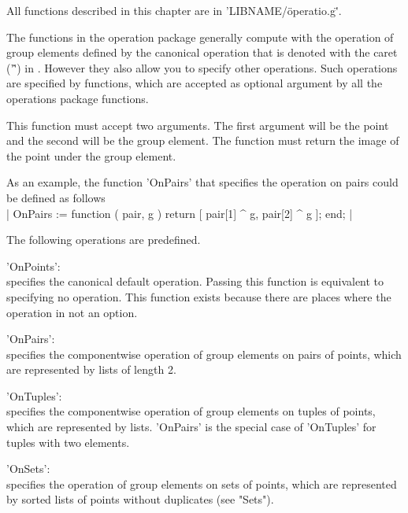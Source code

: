 All functions described in this chapter are in 'LIBNAME/\"operatio.g\"'.

%
%
%
%
%
%
%
%
%
%
%

The functions in   the operation  package   generally  compute  with  the
operation of group elements defined  by the canonical  operation that  is
denoted with the caret ('\^') in {\GAP}.   However they also allow you to
specify other operations.   Such  operations are specified  by functions,
which are  accepted as optional  argument  by all  the operations package
functions.

This function must accept two arguments.   The first argument will be the
point and the second will be the group element.  The function must return
the image of the point under the group element.

As an example, the function  'OnPairs' that  specifies  the operation  on
pairs could be defined as follows\\
|    OnPairs := function ( pair, g )
        return [ pair[1] ^ g, pair[2] ^ g ];
    end; |

The following operations are predefined.

'OnPoints':\\
        specifies the canonical default operation.  Passing this function
        is equivalent to specifying no operation.  This  function  exists
        because there are places where the operation in not an option.

'OnPairs':\\
        specifies the componentwise operation of  group elements on pairs
        of points, which are represented by lists of length 2.

'OnTuples':\\
        specifies the componentwise operation of group elements on tuples
        of points, which are represented  by  lists.   'OnPairs'  is  the
        special case of 'OnTuples' for tuples with two elements.

'OnSets':\\
        specifies  the  operation of group   elements on sets  of points,
        which  are   represented   by  sorted   lists of  points  without
        duplicates (see "Sets").

